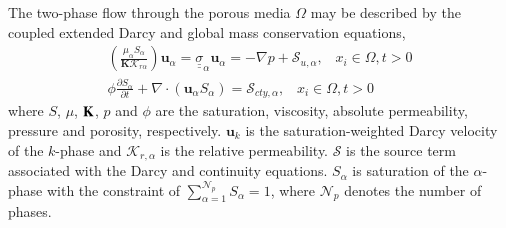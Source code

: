 \documentclass[preprint,authoryear,12pt]{elsarticle}
\begin{document}
The two-phase flow through the porous media $\Omega$ may be described by the coupled extended Darcy and global mass conservation equations,
\begin{eqnarray}
\left(\displaystyle\frac{\mu_{\alpha}S_{\alpha}}{{\mathbf K}\mathcal{K}_{r\alpha}}\right) {\mathbf u}_{\alpha} = \underline{\underline{\sigma}}_{\alpha} {\mathbf u}_{\alpha} = -\nabla p + \mathcal{S}_{u,\alpha},\;\;\; x_{i}\in\Omega, t>0 \label{eqn:darcy_eqn} \\
\phi\displaystyle\frac{\partial S_{\alpha} }{\partial t} +   \nabla \cdot \left( {\mathbf u}_{\alpha}  S_{\alpha}\right) =  \mathcal{S}_{cty,\alpha},\;\;\; x_{i}\in\Omega, t>0\label{eqn:saturation_eqn}
\end{eqnarray}
where $S$, $\mu$, ${\bf K}$, $p$ and $\phi$ are the saturation, viscosity, absolute permeability, pressure and porosity, respectively. ${\mathbf u}_{k}$ is the saturation-weighted Darcy velocity of the $k$-phase and $\mathcal{K}_{r,\alpha}$ is the relative permeability. $\mathcal{S}$ is the source term associated with the Darcy and continuity equations. $S_{\alpha}$ is saturation of the $\alpha$-phase with the constraint of $\sum\limits_{\alpha=1}^{\mathcal{N}_{p}} S_{\alpha} = 1$, where $\mathcal{N}_{p}$ denotes the number of phases.

\end{document}
